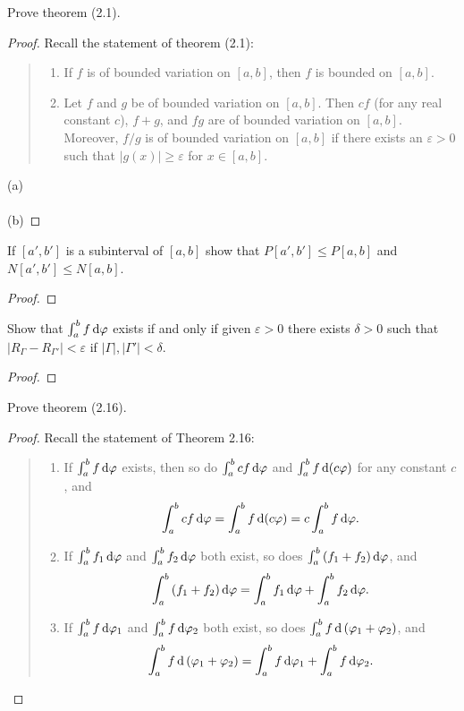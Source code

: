 \begin{problem}
Prove theorem (2.1).
\end{problem}
\begin{proof}
Recall the statement of theorem (2.1):
\begin{quote}
\begin{enumerate}[label=(\alph*)]
\item If $f$ is of bounded variation on $[a,b]$, then $f$ is bounded on
  $[a,b]$.
\item Let $f$ and $g$ be of bounded variation on $[a,b]$. Then $cf$ (for
  any real constant $c$), $f+g$, and $fg$ are of bounded variation on
  $[a,b]$. Moreover, $f/g$ is of bounded variation on $[a,b]$ if there
  exists an $\varepsilon>0$ such that $|g(x)|\geq\varepsilon$ for
  $x\in[a,b]$.
\end{enumerate}
\end{quote}
\noindent
(a)
\\\\
(b)
\end{proof}

\begin{problem}
If $[a',b']$ is a subinterval of $[a,b]$ show that $P[a',b']\leq P[a,b]$
and $N[a',b']\leq N[a,b]$.
\end{problem}
\begin{proof}
\end{proof}
\begin{problem}
Show that $\int_a^bf\mathop{}\!\mathrm{d}\varphi$ exists if and only if given $\varepsilon>0$
there exists $\delta>0$ such that
$\left|R_\Gamma-R_{\Gamma'}\right|<\varepsilon$ if
$|\Gamma|,|\Gamma'|<\delta$.
\end{problem}
\begin{proof}
\end{proof}

\begin{problem}
Prove theorem (2.16).
\end{problem}
\begin{proof}
Recall the statement of Theorem 2.16:
\begin{quote}
\begin{enumerate}[label=(\roman*)]
\item If $\int_a^b f\mathop{}\!\mathrm{d}\varphi$ exists, then so do $\int_a^bcf\mathop{}\!\mathrm{d}\varphi$ and
  $\int_a^b f\mathop{}\!\mathrm{d}(c\varphi)$ for any constant $c$, and
\[
\int_a^bcf\mathop{}\!\mathrm{d}\varphi=\int_a^bf\mathop{}\!\mathrm{d}(c\varphi)=c\int_a^bf\mathop{}\!\mathrm{d}\varphi.
\]
\item If $\int_a^b f_1\mathop{}\!\mathrm{d}\varphi$ and $\int_a^bf_2\mathop{}\!\mathrm{d}\varphi$ both exist, so
  does $\int_a^b\left(f_1+f_2\right)\mathop{}\!\mathrm{d}\varphi$, and
\[
\int_a^b\left(f_1+f_2\right)\mathop{}\!\mathrm{d}\varphi=\int_a^bf_1\mathop{}\!\mathrm{d}\varphi+\int_a^bf_2\mathop{}\!\mathrm{d}\varphi.
\]
\item If $\int_a^bf\mathop{}\!\mathrm{d}\varphi_1$ and $\int_a^bf\mathop{}\!\mathrm{d}\varphi_2$ both exist, so
  does $\int_a^bf\mathop{}\!\mathrm{d}\left(\varphi_1+\varphi_2\right)$, and
\[
\int_a^bf\mathop{}\!\mathrm{d}\left(\varphi_1+\varphi_2\right)=\int_a^bf\mathop{}\!\mathrm{d}\varphi_1+\int_a^bf\mathop{}\!\mathrm{d}\varphi_2.
\]
\end{enumerate}
\end{quote}
\end{proof}

